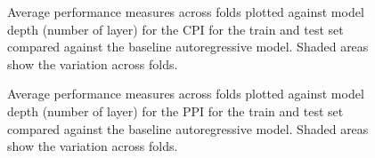 \documentclass{article}
\theoremstyle{plain}
\theoremstyle{definition}
\theoremstyle{remark}
\begin{document}
\begin{figure}


\caption{\label{fig-cpi-b}Average performance measures across folds plotted against model depth (number of layer) for the CPI for the train and test set compared against the baseline autoregressive model. Shaded areas show the variation across folds.}

\end{figure}%


\begin{figure}


\caption{\label{fig-ppi-b}Average performance measures across folds plotted against model depth (number of layer) for the PPI for the train and test set compared against the baseline autoregressive model. Shaded areas show the variation across folds.}

\end{figure}%

\end{document}
